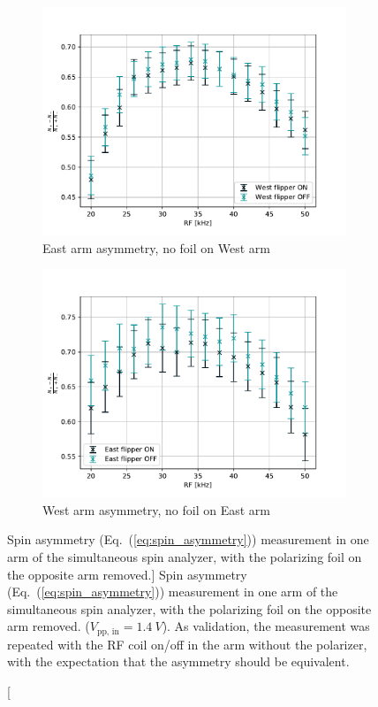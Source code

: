 \begin{figure}
\centering
\begin{subfigure}{.5\textwidth} 
  \centering
  \includegraphics[width=\textwidth]{figures/SSA_east_arm_no_west_foil.pdf}
  \caption{East arm asymmetry, no foil on West arm }\label{subfig:SSA_east_arm_no_west_foil}
\end{subfigure}%
\begin{subfigure}{.5\textwidth}
  \centering
  \includegraphics[width=\textwidth]{figures/SSA_west_arm_no_west_foil.pdf}
  \caption{West arm asymmetry, no foil on East arm}\label{subfig:SSA_west_arm_no_west_foil}
\end{subfigure}
\caption
    [Spin asymmetry (Eq.~(\ref{eq:spin_asymmetry})) measurement in one arm of the simultaneous spin analyzer, with the polarizing foil on the opposite arm removed.]
    {Spin asymmetry (Eq.~(\ref{eq:spin_asymmetry})) measurement in one arm of the simultaneous spin analyzer, with the polarizing foil on the opposite arm removed. ($V_\text{pp, in}=\qty{1.4}{V}$). As validation, the measurement was repeated with the RF coil on/off in the arm without the polarizer, with the expectation that the asymmetry should be equivalent.}
\label{fig:SSA_asym_one_foil_out}
\end{figure}

